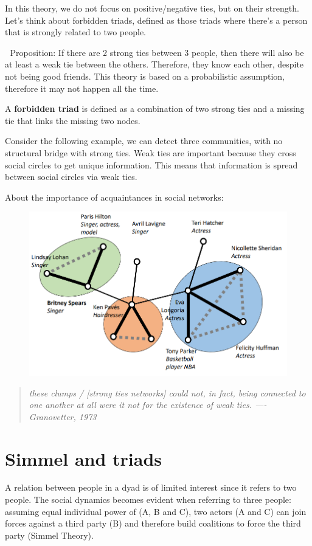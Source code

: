 \documentclass[
  notitlepage,
  onecolumn,
  openany]{book}
\begin{document}
In this theory, we do not focus on positive/negative ties, but on their strength. Let's think about forbidden triads, defined as those triads where there's a person that is strongly related to two people.

💁️ Proposition: If there are 2 strong ties between 3 people, then there will also be at least a weak tie between the others. Therefore, they know each other, despite not being good friends. This theory is based on a probabilistic assumption, therefore it may not happen all the time.

A \textbf{forbidden triad} is defined as a combination of two strong ties and a missing tie that links the missing two nodes.

Consider the following example, we can detect three communities, with no structural bridge with strong ties. Weak ties are important because they cross social circles to get unique information. This means that information is spread between social circles via weak ties.

About the importance of acquaintances in social networks:

\begin{figure}[h!]

{\centering \includegraphics[width=0.5\linewidth]{images/07-Triads and structural holes/Untitled 1} 

}

\end{figure}

\begin{quote}
\emph{these clumps / {[}strong ties networks{]} could not,
in fact, being connected to one another at all were
it not for the existence of weak ties.
---- Granovetter, 1973}
\end{quote}

\hypertarget{simmel-and-triads}{%
\section{Simmel and triads}\label{simmel-and-triads}}

A relation between people in a dyad is of limited interest since it refers to two people. The social dynamics becomes evident when referring to three people: assuming equal individual power of (A, B and C), two actors (A and C) can join forces against a third party (B) and therefore build coalitions to force the third party (Simmel Theory).
\end{document}

